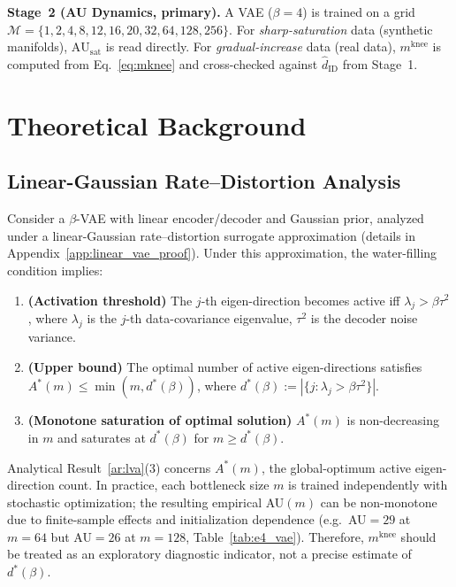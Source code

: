 \documentclass[make,article,submit,pdftex,moreauthors]{Definitions/mdpi}
\newcommand{\AUsat}{\mathrm{AU}_{\mathrm{sat}}}
\newcommand{\mknee}{m^{\mathrm{knee}}}
\newcommand{\hatdID}{\hat{d}_{\mathrm{ID}}}
\begin{document}
\textbf{Stage~2 (AU Dynamics, primary).}
A VAE ($\beta=4$) is trained on a grid
$\mathcal{M}=\{1,2,4,8,12,16,20,32,64,128,256\}$.
For \emph{sharp-saturation} data (synthetic manifolds), $\AUsat$ is read directly.
For \emph{gradual-increase} data (real data), $\mknee$ is computed from
Eq.~\eqref{eq:mknee} and cross-checked against $\hatdID$ from Stage~1.

\section{Theoretical Background}\label{sec:theory}

\subsection{Linear-Gaussian Rate--Distortion Analysis}
\label{sec:theory_lva}

\begin{analytical}
\label{ar:lva}
Consider a $\beta$-VAE with linear encoder/decoder and Gaussian prior, analyzed
under a linear-Gaussian rate--distortion surrogate approximation
(details in Appendix~\ref{app:linear_vae_proof}).
Under this approximation, the water-filling condition implies:
\begin{enumerate}
\item \textbf{(Activation threshold)} The $j$-th eigen-direction becomes active iff
  $\lambda_j>\beta\tau^2$,
  where $\lambda_j$ is the $j$-th data-covariance eigenvalue, $\tau^2$ is the decoder noise variance.
\item \textbf{(Upper bound)} The optimal number of active eigen-directions satisfies
  $A^*(m)\leq\min(m,d^*(\beta))$, where $d^*(\beta):=|\{j:\lambda_j>\beta\tau^2\}|$.
\item \textbf{(Monotone saturation of optimal solution)}
  $A^*(m)$ is non-decreasing in $m$ and saturates at $d^*(\beta)$ for $m\geq d^*(\beta)$.
\end{enumerate}
\end{analytical}

\begin{remark}
Analytical Result~\ref{ar:lva}(3) concerns $A^*(m)$, the global-optimum active
eigen-direction count.  In practice, each bottleneck size $m$ is trained
independently with stochastic optimization; the resulting empirical AU$(m)$ can
be non-monotone due to finite-sample effects and initialization dependence
(e.g.\ AU$=29$ at $m=64$ but AU$=26$ at $m=128$, Table~\ref{tab:e4_vae}).
Therefore, $\mknee$ should be treated as an exploratory diagnostic indicator,
not a precise estimate of $d^*(\beta)$.
\end{remark}
\end{document}
